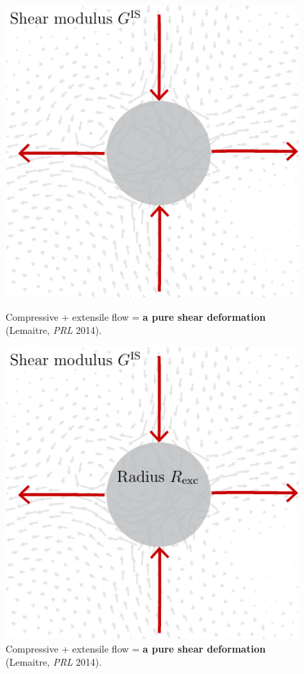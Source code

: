 \begin{frame}[c]
\begin{columns}[T]
\begin{column}[T]{0.4\textwidth}
\begin{figure}[t]
\begin{overprint}
\centering\includegraphics[width=0.85\linewidth]{b.1-exc_pureshear/zoomin-7.pdf}\caption{Compressive + extensile flow = \textbf{a pure shear deformation} {\footnotesize (Lemaitre, \textit{PRL} 2014).}}

\centering\includegraphics[width=0.85\linewidth]{b.1-exc_pureshear/zoomin-8.pdf}\caption{Compressive + extensile flow = \textbf{a pure shear deformation} {\footnotesize (Lemaitre, \textit{PRL} 2014).}}


\end{overprint}
\end{figure}
\end{column}
\end{columns}
\end{frame}

